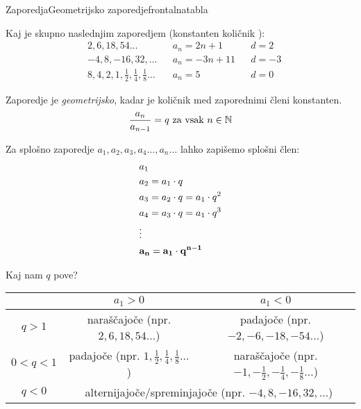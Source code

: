 \begin{priprava}{}{}{Zaporedja}{Geometrijsko zaporedje}{frontalna}{tabla}

 Kaj je skupno naslednjim zaporedjem (konstanten količnik ):
\begin{align*}
    & 2, 6, 18, 54 \ldots && a_n = 2n+1 && d = 2 \\
    & -4, 8, -16, 32,  \ldots && a_n = -3n+11 && d = -3 \\
    & 8, 4, 2, 1, \frac{1}{2}, \frac{1}{4}, \frac{1}{8} \ldots && a_n = 5 && d = 0
\end{align*}

Zaporedje je \emph{geometrijsko}, kadar je količnik med zaporednimi členi konstanten.
$$ \frac{a_n}{a_{n-1}} = q \text{ za vsak } n \in \mathbb{N} $$

Za splošno zaporedje $ a_1, a_2, a_3, a_4 \ldots, a_n \ldots $ lahko zapišemo splošni člen:
\begin{align*}
    & a_1 \\
    & a_2 = a_1 \cdot q \\
    & a_3 = a_2 \cdot q = a_1 \cdot q^2 \\
    & a_4 = a_3 \cdot q = a_1 \cdot q^3 \\
    & \vdots \\
    & \bf{a_n = a_1 \cdot q^{n-1}}
\end{align*}

Kaj nam $ q $ pove? 

\begin{center}
    \begin{tabular}{ |c|c|c| } 
     \hline
     & $ a_1 > 0 $ & $ a_1 < 0 $ \\
     \hline
     $ q > 1 $ & naraščajoče (npr. $ 2, 6, 18, 54 \ldots $) & padajoče (npr. $ -2, -6, -18, -54 \ldots $) \\
     \hline 
     $ 0 < q < 1 $ & padajoče (npr. $ 1, \frac{1}{2}, \frac{1}{4}, \frac{1}{8} \ldots $) & naraščajoče (npr. $ -1, -\frac{1}{2}, -\frac{1}{4}, -\frac{1}{8} \ldots $) \\ 
     \hline
     $ q < 0 $ & \multicolumn{2}{|c|}{alternijajoče/spreminjajoče (npr. $ -4, 8, -16, 32,  \ldots $)} \\
     \hline
    \end{tabular}
    \end{center}


\end{priprava}
